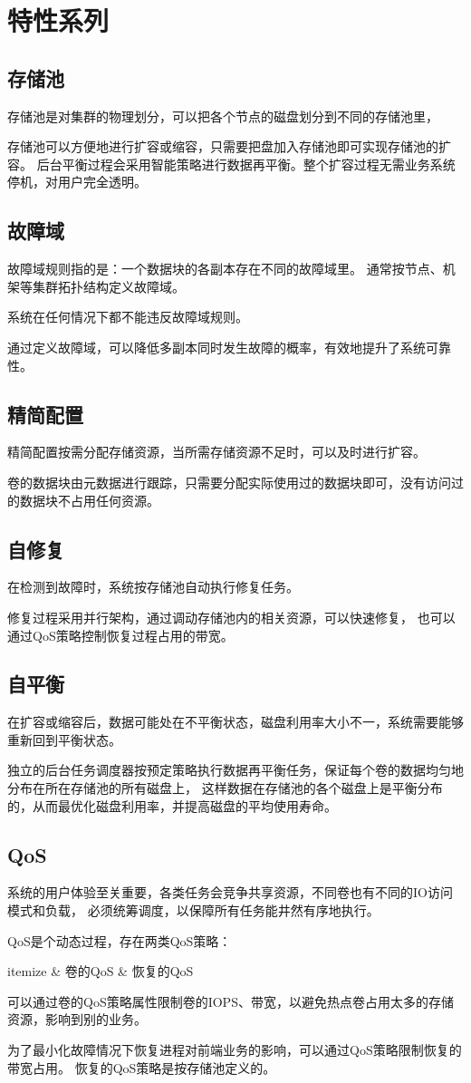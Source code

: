 \chapter{特性系列}

\section{存储池}

存储池是对集群的物理划分，可以把各个节点的磁盘划分到不同的存储池里，

存储池可以方便地进行扩容或缩容，只需要把盘加入存储池即可实现存储池的扩容。
后台平衡过程会采用智能策略进行数据再平衡。整个扩容过程无需业务系统停机，对用户完全透明。

\section{故障域}

故障域规则指的是：一个数据块的各副本存在不同的故障域里。
通常按节点、机架等集群拓扑结构定义故障域。

系统在任何情况下都不能违反故障域规则。

通过定义故障域，可以降低多副本同时发生故障的概率，有效地提升了系统可靠性。

\section{精简配置}

精简配置按需分配存储资源，当所需存储资源不足时，可以及时进行扩容。

卷的数据块由元数据进行跟踪，只需要分配实际使用过的数据块即可，没有访问过的数据块不占用任何资源。

\section{自修复}

在检测到故障时，系统按存储池自动执行修复任务。

修复过程采用并行架构，通过调动存储池内的相关资源，可以快速修复，
也可以通过QoS策略控制恢复过程占用的带宽。

\section{自平衡}

在扩容或缩容后，数据可能处在不平衡状态，磁盘利用率大小不一，系统需要能够重新回到平衡状态。

独立的后台任务调度器按预定策略执行数据再平衡任务，保证每个卷的数据均匀地分布在所在存储池的所有磁盘上，
这样数据在存储池的各个磁盘上是平衡分布的，从而最优化磁盘利用率，并提高磁盘的平均使用寿命。

\section{QoS}

系统的用户体验至关重要，各类任务会竞争共享资源，不同卷也有不同的IO访问模式和负载，
必须统筹调度，以保障所有任务能井然有序地执行。

QoS是个动态过程，存在两类QoS策略：
\begin{myeasylist}{itemize}
& 卷的QoS
& 恢复的QoS
\end{myeasylist}

可以通过卷的QoS策略属性限制卷的IOPS、带宽，以避免热点卷占用太多的存储资源，影响到别的业务。

为了最小化故障情况下恢复进程对前端业务的影响，可以通过QoS策略限制恢复的带宽占用。
恢复的QoS策略是按存储池定义的。
